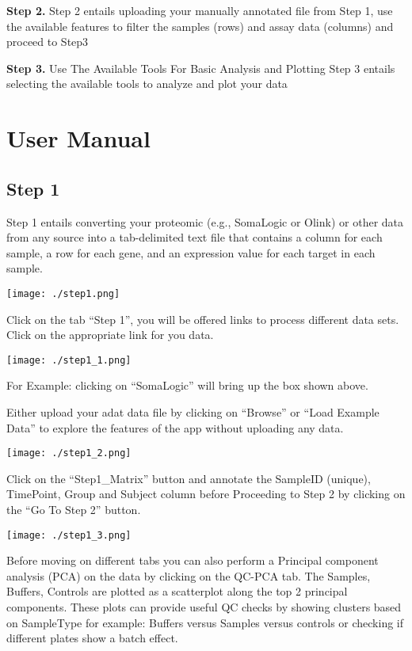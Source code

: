\documentclass[]{article}
\begin{document}
\textbf{Step 2.} Step 2 entails uploading your manually annotated file
from Step 1, use the available features to filter the samples (rows) and
assay data (columns) and proceed to Step3

\textbf{Step 3.} Use The Available Tools For Basic Analysis and Plotting
Step 3 entails selecting the available tools to analyze and plot your
data

\newpage

\hypertarget{user-manual}{%
\section{User Manual}\label{user-manual}}

\hypertarget{step-1}{%
\subsection{Step 1}\label{step-1}}

Step 1 entails converting your proteomic (e.g., SomaLogic or Olink) or
other data from any source into a tab-delimited text file that contains
a column for each sample, a row for each gene, and an expression value
for each target in each sample.

\texttt{[image: ./step1.png]}

 Click on the tab ``Step 1'', you will be offered links to process
different data sets. Click on the appropriate link for you data.

\texttt{[image: ./step1\_1.png]}

 For Example: clicking on ``SomaLogic'' will bring up the box shown
above.

Either upload your adat data file by clicking on ``Browse'' or ``Load
Example Data'' to explore the features of the app without uploading any
data.

\texttt{[image: ./step1\_2.png]}

 Click on the ``Step1\_Matrix'' button and annotate the SampleID
(unique), TimePoint, Group and Subject column before Proceeding to Step
2 by clicking on the ``Go To Step 2'' button.

\texttt{[image: ./step1\_3.png]}

 Before moving on different tabs you can also perform a Principal
component analysis (PCA) on the data by clicking on the QC-PCA tab. The
Samples, Buffers, Controls are plotted as a scatterplot along the top 2
principal components. These plots can provide useful QC checks by
showing clusters based on SampleType for example: Buffers versus Samples
versus controls or checking if different plates show a batch effect.
\end{document}
